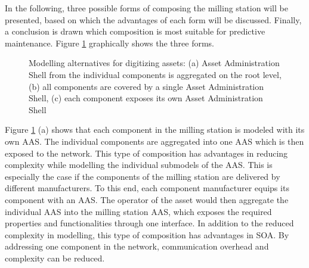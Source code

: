 In the following, three possible forms of composing the milling station will be presented, based on which the advantages of each form will be discussed. Finally, a conclusion is drawn which composition is most suitable for predictive maintenance. Figure \ref{fig:aas-modeling-alternatives} graphically shows the three forms.

\begin{figure}[h]
\centering
{}
\caption{Modelling alternatives for digitizing assets: (a) Asset Administration Shell from the individual components is aggregated on the root level, (b) all components are covered by a single Asset Administration Shell, (c) each component exposes its own Asset Administration Shell}
\label{fig:aas-modeling-alternatives}
\end{figure}

Figure \ref{fig:aas-modeling-alternatives} (a) shows that each component in the milling station is modeled with its own \ac{AAS}. The individual components are aggregated into one \ac{AAS} which is then exposed to the network. This type of composition has advantages in reducing complexity while modelling the individual submodels of the \ac{AAS}. This is especially the case if the components of the milling station are delivered by different manufacturers. To this end, each component manufacturer equips its component with an \ac{AAS}. The operator of the asset would then aggregate the individual \ac{AAS} into the milling station \ac{AAS}, which exposes the required properties and functionalities through one interface. In addition to the reduced complexity in modelling, this type of composition has advantages in \ac{SOA}. By addressing one component in the network, communication overhead and complexity can be reduced.

